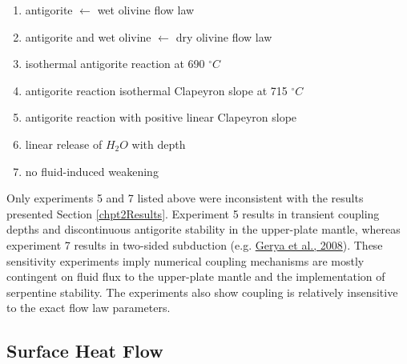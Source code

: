 \begin{enumerate}
\def\labelenumi{\arabic{enumi}.}
\tightlist
\item
  antigorite \(\leftarrow\) wet olivine flow law
\item
  antigorite and wet olivine \(\leftarrow\) dry olivine flow law
\item
  isothermal antigorite reaction at 690 \(^{\circ}C\)
\item
  antigorite reaction isothermal Clapeyron slope at 715 \(^{\circ}C\)
\item
  antigorite reaction with positive linear Clapeyron slope
\item
  linear release of \(H_{2}O\) with depth
\item
  no fluid-induced weakening
\end{enumerate}

Only experiments 5 and 7 listed above were inconsistent with the results presented Section \ref{chpt2Results}. Experiment 5 results in transient coupling depths and discontinuous antigorite stability in the upper-plate mantle, whereas experiment 7 results in two-sided subduction (e.g. \protect\hyperlink{ref-gerya2008}{Gerya et al., 2008}). These sensitivity experiments imply numerical coupling mechanisms are mostly contingent on fluid flux to the upper-plate mantle and the implementation of serpentine stability. The experiments also show coupling is relatively insensitive to the exact flow law parameters.

\hypertarget{surface-heat-flow-1}{%
\subsection{Surface Heat Flow}\label{surface-heat-flow-1}}

